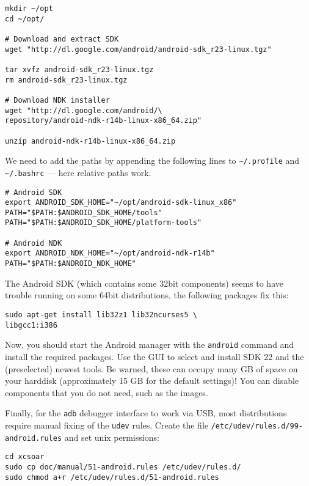 \begin{verbatim}
mkdir ~/opt
cd ~/opt/

# Download and extract SDK
wget "http://dl.google.com/android/android-sdk_r23-linux.tgz"

tar xvfz android-sdk_r23-linux.tgz
rm android-sdk_r23-linux.tgz

# Download NDK installer
wget "http://dl.google.com/android/\
repository/android-ndk-r14b-linux-x86_64.zip"

unzip android-ndk-r14b-linux-x86_64.zip
\end{verbatim}

We need to add the paths by appending the following lines to \texttt{\textasciitilde/.profile} and \texttt{\textasciitilde/.bashrc} --- here relative paths work.

\begin{verbatim}
# Android SDK
export ANDROID_SDK_HOME="~/opt/android-sdk-linux_x86"
PATH="$PATH:$ANDROID_SDK_HOME/tools"
PATH="$PATH:$ANDROID_SDK_HOME/platform-tools"

# Android NDK
export ANDROID_NDK_HOME="~/opt/android-ndk-r14b"
PATH="$PATH:$ANDROID_NDK_HOME"
\end{verbatim}

The Android SDK (which contains some 32bit components) seems to have trouble running on some 64bit distributions, the following packages fix this:

\begin{verbatim}
sudo apt-get install lib32z1 lib32ncurses5 \
libgcc1:i386
\end{verbatim}

Now, you should start the Android manager with the \texttt{android} command and install the required packages.
Use the GUI to select and install SDK 22 and the (preselected) newest tools.
Be warned, these can occupy many GB of space on your harddisk (approximately 15 GB for the default settings)! You can disable components that you do not need, such as the images.

Finally, for the \texttt{adb} debugger interface to work via USB, most distributions require manual fixing of the \texttt{udev} rules.
Create the file \texttt{/etc/udev/rules.d/99-android.rules} and set unix permissions:

\begin{verbatim}
cd xcsoar
sudo cp doc/manual/51-android.rules /etc/udev/rules.d/
sudo chmod a+r /etc/udev/rules.d/51-android.rules
\end{verbatim}

